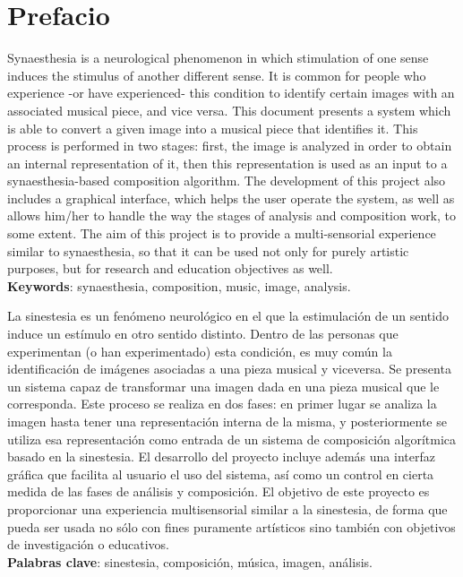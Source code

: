 \chapter*{Prefacio}

\small

Synaesthesia is a neurological phenomenon in which stimulation of one sense induces the stimulus of another different sense. It is common for people who experience -or have experienced- this condition to identify certain images with an associated musical piece, and vice versa. This document presents a system which is able to convert a given image into a musical piece that identifies it. This process is performed in two stages: first, the image is analyzed in order to obtain an internal representation of it, then this representation is used as an input to a synaesthesia-based composition algorithm. The development of this project also includes a graphical interface, which helps the user operate the system, as well as allows him/her to handle the way the stages of analysis and composition work, to some extent. The aim of this project is to provide a multi-sensorial experience similar to synaesthesia, so that it can be used not only for purely artistic purposes, but for research and education objectives as well.\\

\noindent\textbf{Keywords}: synaesthesia, composition, music, image, analysis.\\

\vspace{0.3in}



La sinestesia es un fenómeno neurológico en el que la estimulación de un sentido induce un estímulo en otro sentido distinto. Dentro de las personas que experimentan (o han experimentado) esta condición, es muy común la identificación de imágenes asociadas a una pieza musical y viceversa. Se presenta un sistema capaz de transformar una imagen dada en una pieza musical que le corresponda. Este proceso se realiza en dos fases: en primer lugar se analiza la imagen hasta tener una representación interna de la misma, y posteriormente se utiliza esa representación como entrada de un sistema de composición algorítmica basado en la sinestesia. El desarrollo del proyecto incluye además una interfaz gráfica que facilita al usuario el uso del sistema, así como un control en cierta medida de las fases de análisis y composición. El objetivo de este proyecto es proporcionar una experiencia multisensorial similar a la sinestesia, de forma que pueda ser usada no sólo con fines puramente artísticos sino también con objetivos de investigación o educativos.\\


\noindent\textbf{Palabras clave}: sinestesia, composición, música, imagen, análisis.\\


\normalsize